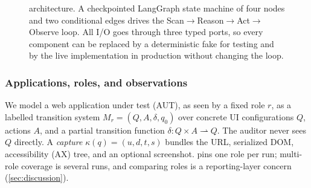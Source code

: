 \begin{figure}[t]
{}
\caption{\sys{} architecture. A checkpointed LangGraph state machine of four
nodes and two conditional edges drives the Scan$\to$Reason$\to$Act$\to$Observe
loop. All I/O goes through three typed ports, so every component can be
replaced by a deterministic fake for testing and by the live implementation in
production without changing the loop.}
\label{fig:arch}
\end{figure}


\subsubsection{Applications, roles, and observations}

We model a web application under test (AUT), as seen by a fixed role $r$, as a
labelled transition system $M_r=(Q,A,\delta,q_0)$ over concrete UI
configurations $Q$, actions $A$, and a partial transition function
$\delta:Q\times A\rightharpoonup Q$. The auditor never sees $Q$ directly. A
\emph{capture} $\kappa(q)=(u,d,t,s)$ bundles the URL, serialized DOM,
accessibility (AX) tree, and an optional screenshot. \sys{} pins one role per
run; multi-role coverage is several runs, and comparing roles is a
reporting-layer concern (\cref{sec:discussion}).

